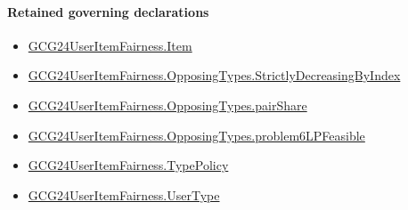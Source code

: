 \documentclass[10pt]{article}
\begin{document}
\paragraph{Retained governing declarations}
\begin{itemize}\raggedright
\item \hyperlink{governing-declaration-a7c560a429c6e204}{GCG24\allowbreak{}User\allowbreak{}Item\allowbreak{}Fairness.\allowbreak{}Item}
\item \hyperlink{governing-declaration-8278344d2ddef9a8}{GCG24\allowbreak{}User\allowbreak{}Item\allowbreak{}Fairness.\allowbreak{}Opposing\allowbreak{}Types.\allowbreak{}Strictly\allowbreak{}Decreasing\allowbreak{}By\allowbreak{}Index}
\item \hyperlink{governing-declaration-1663e30d856ccba9}{GCG24\allowbreak{}User\allowbreak{}Item\allowbreak{}Fairness.\allowbreak{}Opposing\allowbreak{}Types.\allowbreak{}pair\allowbreak{}Share}
\item \hyperlink{governing-declaration-1b64167397f5ef5d}{GCG24\allowbreak{}User\allowbreak{}Item\allowbreak{}Fairness.\allowbreak{}Opposing\allowbreak{}Types.\allowbreak{}problem6\allowbreak{}LP\allowbreak{}Feasible}
\item \hyperlink{governing-declaration-dc7776cb642fa9dc}{GCG24\allowbreak{}User\allowbreak{}Item\allowbreak{}Fairness.\allowbreak{}Type\allowbreak{}Policy}
\item \hyperlink{governing-declaration-fd2c25ccc96ab645}{GCG24\allowbreak{}User\allowbreak{}Item\allowbreak{}Fairness.\allowbreak{}User\allowbreak{}Type}
\end{itemize}
\end{document}
